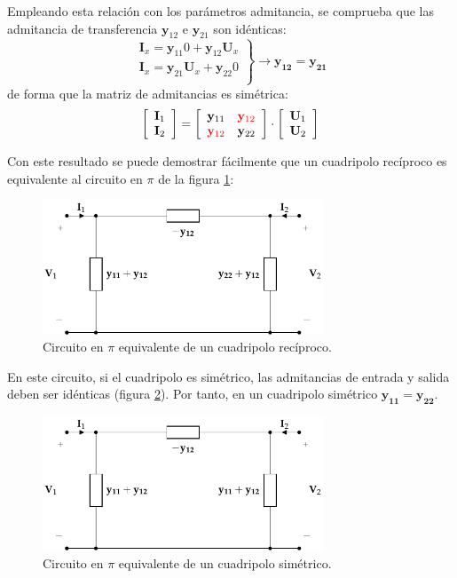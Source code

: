 Empleando esta relación con los parámetros admitancia, se comprueba
que las admitancia de transferencia $\mathbf{y}_{12}$ e
$\mathbf{y}_{21}$ son idénticas:
\[
  \left.
    \begin{array}{l}
      \mathbf{I}_x = \mathbf{y}_{11} 0  + \mathbf{y}_{12} \mathbf{U}_x\\
      \mathbf{I}_x = \mathbf{y}_{21} \mathbf{U}_x + \mathbf{y}_{22} 0\\
    \end{array} \right\} \rightarrow \mathbf{y_{12}} = \mathbf{y_{21}}
\]
de forma que la matriz de admitancias es simétrica:
\[
  \left[
    \begin{array}{c}
      \mathbf{I}_1\\
      \mathbf{I}_2
    \end{array}
  \right] = \left[
    \begin{array}{cc}
      \mathbf{y}_{11} & \color{red}{\mathbf{y}_{12}}\\
      \color{red}{\mathbf{y}_{12}} & \mathbf{y}_{22}
    \end{array}
  \right] \cdot \left[
    \begin{array}{c}
      \mathbf{U}_1\\
      \mathbf{U}_2
    \end{array}
  \right]
\]

Con este resultado se puede demostrar fácilmente que un cuadripolo
recíproco es equivalente al circuito en $\pi$ de la figura
\ref{fig:admitancia-equivalente-recíproco}:

\begin{figure}[H]
  \centering
  \includegraphics[height=4cm]{../figs/circuitoEquivalenteYReciproco.pdf}
  \caption{Circuito en $\pi$ equivalente de un cuadripolo recíproco.}
  \label{fig:admitancia-equivalente-recíproco}
\end{figure}

En este circuito, si el cuadripolo es simétrico, las admitancias de
entrada y salida deben ser idénticas (figura
\ref{fig:admitancia-equivalente-simétrico}). Por tanto, en un
cuadripolo simétrico $\mathbf{y_{11}} = \mathbf{y_{22}}$.
\begin{figure}[H]
  \centering
  \includegraphics[height=4cm]{../figs/circuitoEquivalenteYSimetrico.pdf}
  \caption{Circuito en $\pi$ equivalente de un cuadripolo simétrico.}
  \label{fig:admitancia-equivalente-simétrico}
\end{figure}


